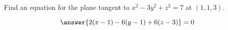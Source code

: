 \documentclass{ximera}
\author{David Guichard \and Neal Koblitz \and H. Jerome Keisler \and Albert Scheller \and Barry Balof \and Mike Wills \and Matthew Carr}
\begin{document}
\begin{exercise}




Find an equation for the plane tangent to $x^2-3y^2+z^2=7$ at $(1,1,3)$.

\begin{prompt}
\[
\answer{2(x-1)-6(y-1)+6(z-3)}=0
\]
\end{prompt}


\end{exercise}
\end{document}
